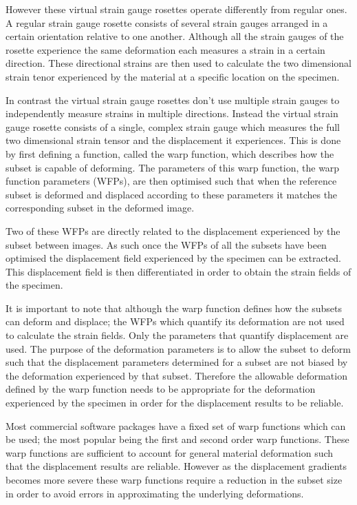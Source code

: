 \documentclass[12pt,oneside,openany,a4paper, %
english, %
masters-t, goldenblock]{usthesis}
\begin{document}
However these virtual strain gauge rosettes operate differently from regular ones. A regular strain gauge rosette consists of several strain gauges arranged in a certain orientation relative to one another. Although all the strain gauges of the rosette experience the same deformation each measures a strain in a certain direction. These directional strains are then used to calculate the two dimensional strain tenor experienced by the material at a specific location on the specimen.

In contrast the virtual strain gauge rosettes don't use multiple strain gauges to independently measure strains in multiple directions. Instead the virtual strain gauge rosette consists of a single, complex strain gauge which measures the full two dimensional strain tensor and the displacement it experiences. This is done by first defining a function, called the warp function, which describes how the subset is capable of deforming. The parameters of this warp function, the warp function parameters (WFPs), are then optimised such that when the reference subset is deformed and displaced according to these parameters it matches the corresponding subset in the deformed image.

Two of these WFPs are directly related to the displacement experienced by the subset between images. As such once the WFPs of all the subsets have been optimised the displacement field experienced by the specimen can be extracted. This displacement field is then differentiated in order to obtain the strain fields of the specimen.

It is important to note that although the warp function defines how the subsets can deform and displace; the WFPs which quantify its deformation are not used to calculate the strain fields. Only the parameters that quantify displacement are used. The purpose of the deformation parameters is to allow the subset to deform such that the displacement parameters determined for a subset are not biased by the deformation experienced by that subset. Therefore the allowable deformation defined by the warp function needs to be appropriate for the deformation experienced by the specimen in order for the displacement results to be reliable.

Most commercial software packages have a fixed set of warp functions which can be used; the most popular being the first and second order warp functions. These warp functions are sufficient to account for general material deformation such that the displacement results are reliable. However as the displacement gradients becomes more severe these warp functions require a reduction in the subset size in order to avoid errors in approximating the underlying deformations. 
\end{document}
